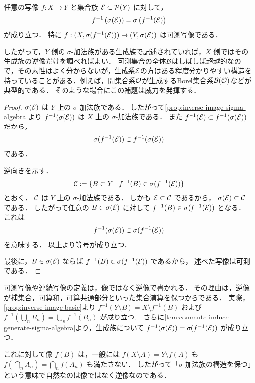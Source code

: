 \begin{lemma} \label{lem:commute-induce-generate-sigma-algebra}
任意の写像 $f: X \to Y$ と集合族 $\mathcal E \subset \mathcal P(Y)$ に対して，
\[
f^{-1}\left(\sigma(\mathcal E)\right) = \sigma\left(f^{-1}(\mathcal E)\right)
\]
が成り立つ．
特に $f : (X,\sigma(f^{-1}(\mathcal E))) \to (Y,\sigma(\mathcal E))$ は可測写像である．
\end{lemma}
\begin{remark}
    したがって，$Y$ 側の $\sigma$-加法族がある生成族で記述されていれば，$X$ 側ではその生成族の逆像だけを調べればよい．
    可測集合の全体$\mathcal B$はしばしば超越的なので，その素性はよく分からないが，生成系$\mathcal E$の方はある程度分かりやすい構造を持っていることがある．例えば，開集合系$\mathcal O$が生成するBorel集合系$\mathcal B(\mathcal O)$などが典型的である．
    そのような場合にこの補題は威力を発揮する．
\end{remark}
\begin{proof}
$\sigma(\mathcal E)$ は $Y$ 上の $\sigma$-加法族である．
したがって\cref{prop:inverse-image-sigma-algebra}より
$f^{-1}(\sigma(\mathcal E))$ は $X$ 上の $\sigma$-加法族である．
また $f^{-1}(\mathcal E)\subset f^{-1}(\sigma(\mathcal E))$ だから，
\[
\sigma(f^{-1}(\mathcal E))\subset f^{-1}(\sigma(\mathcal E))
\]
である．

逆向きを示す．
\[
\mathcal C:=\{B\subset Y\mid f^{-1}(B)\in\sigma(f^{-1}(\mathcal E))\}
\]
とおく．
$\mathcal C$ は $Y$ 上の $\sigma$-加法族である．
しかも $\mathcal E\subset\mathcal C$ であるから，
$\sigma(\mathcal E)\subset\mathcal C$
である．
したがって任意の $B\in\sigma(\mathcal E)$ に対して
$f^{-1}(B)\in\sigma(f^{-1}(\mathcal E))$ となる．
これは
\[
f^{-1}(\sigma(\mathcal E))\subset\sigma(f^{-1}(\mathcal E))
\]
を意味する．
以上より等号が成り立つ．

最後に，$B\in\sigma(\mathcal E)$ ならば
$f^{-1}(B)\in\sigma(f^{-1}(\mathcal E))$ であるから，
述べた写像は可測である．
\end{proof}

\begin{remark}[可測写像の定義はなぜ逆像か]
可測写像や連続写像の定義は，像ではなく逆像で書かれる．
その理由は，逆像が補集合，可算和，可算共通部分といった集合演算を保つからである．
実際，\cref{prop:inverse-image-basic}より
$f^{-1}(Y\setminus B)=X\setminus f^{-1}(B)$ および
$f^{-1}(\bigcup_n B_n)=\bigcup_n f^{-1}(B_n)$ が成り立つ．
さらに\cref{lem:commute-induce-generate-sigma-algebra}より，生成族について
$f^{-1}(\sigma(\mathcal E))=\sigma(f^{-1}(\mathcal E))$
が成り立つ．

これに対して像 $f(B)$ は，一般には
$f(X\setminus A)=Y\setminus f(A)$ も
$f(\bigcap_n A_n)=\bigcap_n f(A_n)$ も満たさない．
したがって「$\sigma$-加法族の構造を保つ」という意味で自然なのは像ではなく逆像なのである．
\end{remark}

